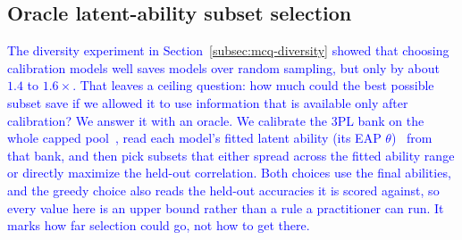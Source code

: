 %
%
%
%

\providecommand{\aiadd}[1]{\textcolor{blue}{#1}}
\providecommand{\aibullets}[1]{{\color{blue}#1}}

\subsection{Oracle latent-ability subset selection}
\label{subsec:mcq-oracle}

\aiadd{The diversity experiment in Section~\ref{subsec:mcq-diversity} showed that
choosing calibration models well saves models over random sampling, but only by
about $1.4$ to $1.6\times$. That leaves a ceiling question: how much could the
best possible subset save if we allowed it to use information that is available
only after calibration? We answer it with an oracle. We calibrate the 3PL bank on
the whole capped pool~\cite{li2026adaptive,chalmers2012mirt}, read each model's
fitted latent ability (its EAP $\theta$)~\cite{lord1980irt,embretson2000irt} from
that bank, and then pick subsets that either spread across the fitted ability
range or directly maximize the held-out correlation. Both choices use the final
abilities, and the greedy choice also reads the held-out accuracies it is scored
against, so every value here is an upper bound rather than a rule a practitioner
can run. It marks how far selection could go, not how to get there.}

